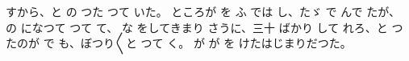 すから、と
の
つた
つて
いた。
ところが
を
ふ
では
し、たゞ
で
んで
たが、
の
になつて
つて
て、
な
をしてきまり
さうに、三十
ばかり
して
れろ、と
つたのが
で
も、ぼつり〳〵と
つて
く。
が
が
を
けたはじまりだつた。

